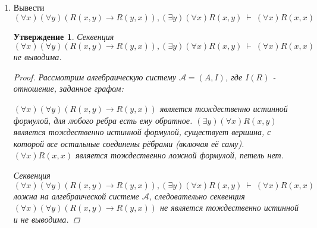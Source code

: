 \documentclass[12pt,a4paper]{article}
\newtheorem{proposition}{Утверждение}
\def\fCenter{\ \vdash\ }
\begin{document}
\begin{enumerate}
\item Вывести $(\forall x)(\forall y)(R(x,y)\to R(y,x)),(\exists y)(\forall x)R(x,y)\fCenter (\forall x)R(x,x)$

\begin{proposition}
Секвенция $(\forall x)(\forall y)(R(x,y)\to R(y,x)),(\exists y)(\forall x)R(x,y)\fCenter (\forall x)R(x,x)$ не выводима.
\begin{proof}
Рассмотрим алгебраическую систему $\mathcal{A}=(A,I)$, где $I(R)$ - отношение, заданное графом:


$(\forall x)(\forall y)(R(x,y)\to R(y,x))$ является тождественно истинной формулой, для любого ребра есть ему обратное. $(\exists y)(\forall x)R(x,y)$ является тождественно истинной формулой, существует вершина, с которой все остальные соединены рёбрами (включая её саму). $(\forall x)R(x,x)$ является тождественно ложной формулой, петель нет.

Секвенция $(\forall x)(\forall y)(R(x,y)\to R(y,x)),(\exists y)(\forall x)R(x,y)\fCenter (\forall x)R(x,x)$ ложна на алгебраической системе $\mathcal{A}$, следовательно секвенция $(\forall x)(\forall y)(R(x,y)\to R(y,x))$ не является тождественно истинной и не выводима.
\end{proof}


\end{proposition}
\end{enumerate}
\end{document}
